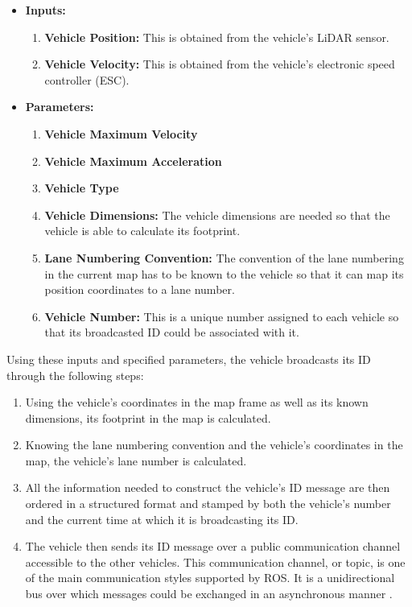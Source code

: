 \begin{itemize}
    \item \textbf{Inputs:}
         \begin{enumerate}
             \item \textbf{Vehicle Position:} This is obtained from the vehicle’s LiDAR sensor.
             \item \textbf{Vehicle Velocity:} This is obtained from the vehicle’s electronic speed controller (ESC).
         \end{enumerate}
    \item \textbf{Parameters:}
         \begin{enumerate}
             \item \textbf{Vehicle Maximum Velocity}
             \item \textbf{Vehicle Maximum Acceleration}
             \item \textbf{Vehicle Type}
             \item \textbf{Vehicle Dimensions:} The vehicle dimensions are needed so that the vehicle is able to calculate its footprint.
             \item \textbf{Lane Numbering Convention:} The convention of the lane numbering in the current map has to be known to the vehicle so that it can map its position coordinates to a lane number.
             \item \textbf{Vehicle Number:} This is a unique number assigned to each vehicle so that its broadcasted ID could be associated with it.
         \end{enumerate}
\end{itemize}
Using these inputs and specified parameters, the vehicle broadcasts its ID through the following steps:

\begin{enumerate}
    \item Using the vehicle’s coordinates in the map frame as well as its known dimensions, its footprint in the map is calculated.
    \item Knowing the lane numbering convention and the vehicle’s coordinates in the map, the vehicle’s lane number is calculated.
    \item All the information needed to construct the vehicle’s ID message are then ordered in a structured format and stamped by both the vehicle’s number and the current time at which it is broadcasting its ID.
    \item The vehicle then sends its ID message over a public communication channel accessible to the other vehicles. This communication channel, or topic, is one of the main communication styles supported by ROS. It is a unidirectional bus over which messages could be exchanged in an asynchronous manner \cite{ROSBookMorgan}.
\end{enumerate}

